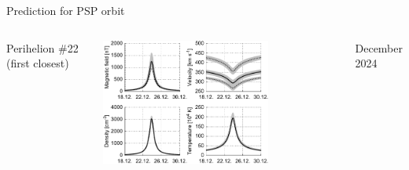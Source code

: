 \begin{frame}[plain,c]{Prediction for PSP orbit}{}
	\begin{columns}[c]
	\column{\textwidth}
		
		\centering
		Perihelion \#22 (first closest)\\\ 
		
		\includegraphics[width=0.7\textwidth]{../talk_figures/SPP_perihelia_prediction_nearest_f_defense.pdf}
		
		
		December 2024
		
% 		
		
	\end{columns}
\end{frame}
